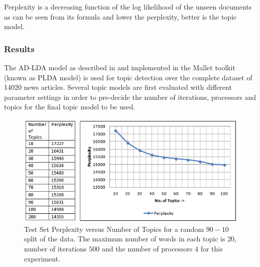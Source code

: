 \documentclass[10pt,journal,compsoc]{IEEEtran}
\begin{document}
Perplexity is a decreasing function of the log likelihood of the unseen documents as can be seen from its formula and lower the perplexity, better is the topic model.

\subsubsection{Results}
\label{topic detection:result}

The AD-LDA model as described in \cite{newman2009distributed} and implemented in the Mallet\cite{McCallumMALLET} toolkit (known as PLDA model) is used for topic detection over the complete dataset of 14020 news articles. 
Several topic models are first evaluated with different parameter settings in order to pre-decide the number of iterations, processors and topics for the final topic model to be used.



\begin{figure}
\begin{center}
\includegraphics{topicperplex2}
\caption{Test Set Perplexity versus Number of Topics for a random $90-10$ split of the data. The maximum number of words in each topic is $20$, number of iterations $500$ and the number of processors $4$ for this experiment.}
\label{figure:perplex}
\end{center}
\end{figure}
\end{document}
